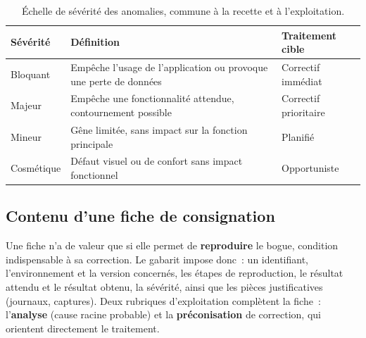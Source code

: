 \begin{table}[htbp]
    \centering
    \renewcommand{\arraystretch}{1.3}
    \begin{tabular}{|p{2.6cm}|p{8.4cm}|p{3cm}|}
        \hline
        \textbf{Sévérité} & \textbf{Définition} & \textbf{Traitement cible} \\
        \hline
        Bloquant & Empêche l'usage de l'application ou provoque une perte de données & Correctif immédiat \\
        \hline
        Majeur & Empêche une fonctionnalité attendue, contournement possible & Correctif prioritaire \\
        \hline
        Mineur & Gêne limitée, sans impact sur la fonction principale & Planifié \\
        \hline
        Cosmétique & Défaut visuel ou de confort sans impact fonctionnel & Opportuniste \\
        \hline
    \end{tabular}
    \caption{Échelle de sévérité des anomalies, commune à la recette et à l'exploitation.}
    \label{tab:severite}
\end{table}

\subsection{Contenu d'une fiche de consignation}
Une fiche n'a de valeur que si elle permet de \textbf{reproduire} le bogue, condition indispensable à sa correction. Le gabarit impose donc~: un identifiant, l'environnement et la version concernés, les étapes de reproduction, le résultat attendu et le résultat obtenu, la sévérité, ainsi que les pièces justificatives (journaux, captures). Deux rubriques d'exploitation complètent la fiche~: l'\textbf{analyse} (cause racine probable) et la \textbf{préconisation} de correction, qui orientent directement le traitement.

